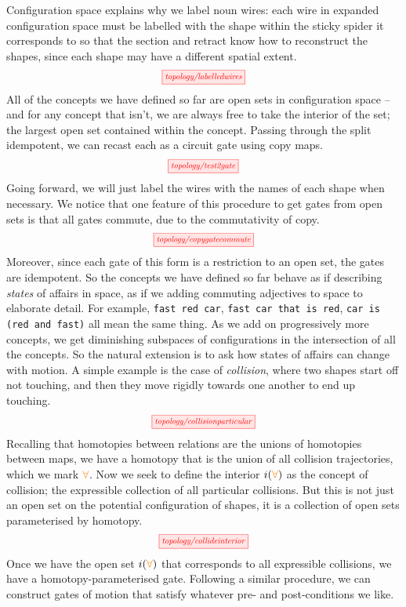 Configuration space explains why we label noun wires: each wire in expanded configuration space must be labelled with the shape within the sticky spider it corresponds to so that the section and retract know how to reconstruct the shapes, since each shape may have a different spatial extent.
\[\scalebox{0.75}{\tikzfig{topology/labelledwires}}\]
All of the concepts we have defined so far are open sets in configuration space -- and for any concept that isn't, we are always free to take the interior of the set; the largest open set contained within the concept. Passing through the split idempotent, we can recast each as a circuit gate using copy maps.
\[\scalebox{0.75}{\tikzfig{topology/test2gate}}\]
Going forward, we will just label the wires with the names of each shape when necessary. We notice that one feature of this procedure to get gates from open sets is that all gates commute, due to the commutativity of copy.
\[\scalebox{0.75}{\tikzfig{topology/copygatecommute}}\]
Moreover, since each gate of this form is a restriction to an open set, the gates are idempotent. So the concepts we have defined so far behave as if describing \emph{states} of affairs in space, as if we adding commuting adjectives to space to elaborate detail. For example, \texttt{fast red car}, \texttt{fast car that is red}, \texttt{car is (red and fast)} all mean the same thing. As we add on progressively more concepts, we get diminishing subspaces of configurations in the intersection of all the concepts. So the natural extension is to ask how states of affairs can change with motion. A simple example is the case of \emph{collision}, where two shapes start off not touching, and then they move rigidly towards one another to end up touching.
\[\scalebox{0.75}{\tikzfig{topology/collisionparticular}}\]
Recalling that homotopies between relations are the unions of homotopies between maps, we have a homotopy that is the union of all collision trajectories, which we mark $\textcolor{orange}{\forall}$. Now we seek to define the interior $i(\textcolor{orange}{\forall})$ as the concept of collision; the expressible collection of all particular collisions. But this is not just an open set on the potential configuration of shapes, it is a collection of open sets parameterised by homotopy.
\[\scalebox{0.75}{\tikzfig{topology/collideinterior}}\]
Once we have the open set $i(\textcolor{orange}{\forall})$ that corresponds to all expressible collisions, we have a homotopy-parameterised gate. Following a similar procedure, we can construct gates of motion that satisfy whatever pre- and post-conditions we like.
